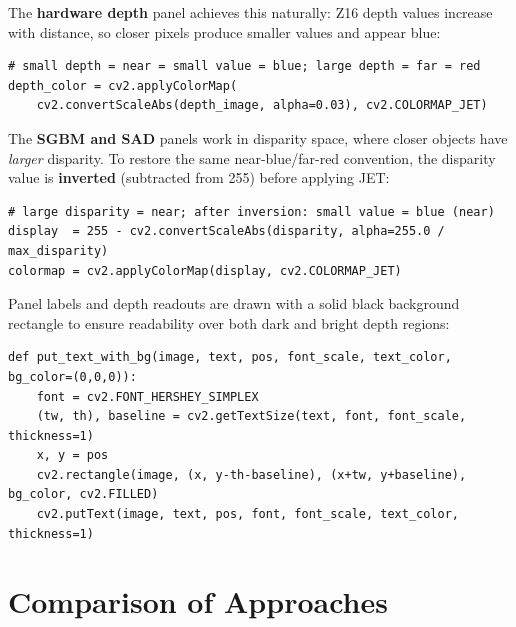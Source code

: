 \documentclass[12pt, a4paper]{article}
\begin{document}
The \textbf{hardware depth} panel achieves this naturally: Z16 depth values
increase with distance, so closer pixels produce smaller values and appear
blue:

\begin{lstlisting}[caption={Hardware depth colourmap --- direct JET mapping}]
# small depth = near = small value = blue; large depth = far = red
depth_color = cv2.applyColorMap(
    cv2.convertScaleAbs(depth_image, alpha=0.03), cv2.COLORMAP_JET)
\end{lstlisting}

The \textbf{SGBM and SAD} panels work in disparity space, where closer objects
have \emph{larger} disparity. To restore the same near-blue/far-red convention,
the disparity value is \textbf{inverted} (subtracted from 255) before applying
JET:

\begin{lstlisting}[caption={Inverted JET colourmap for disparity panels}]
# large disparity = near; after inversion: small value = blue (near)
display  = 255 - cv2.convertScaleAbs(disparity, alpha=255.0 / max_disparity)
colormap = cv2.applyColorMap(display, cv2.COLORMAP_JET)
\end{lstlisting}

Panel labels and depth readouts are drawn with a solid black background
rectangle to ensure readability over both dark and bright depth regions:

\begin{lstlisting}[caption={Text with background helper (live\_stream.py lines 35--40)}]
def put_text_with_bg(image, text, pos, font_scale, text_color, bg_color=(0,0,0)):
    font = cv2.FONT_HERSHEY_SIMPLEX
    (tw, th), baseline = cv2.getTextSize(text, font, font_scale, thickness=1)
    x, y = pos
    cv2.rectangle(image, (x, y-th-baseline), (x+tw, y+baseline), bg_color, cv2.FILLED)
    cv2.putText(image, text, pos, font, font_scale, text_color, thickness=1)
\end{lstlisting}

\newpage
\section{Comparison of Approaches}
\end{document}
